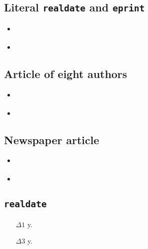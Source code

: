 \documentclass[a4paper,12pt]{scrartcl}
\newcommand{\Feld}[1]{\texttt{#1}}
\begin{document}
\subsection{Literal \Feld{realdate} and \Feld{eprint}}
\begin{itemize}
    \item\cite{lindauer:oj}%
    \item{}%
\end{itemize}

\subsection{Article of eight authors}
\begin{itemize}
    \item\cite{summerhayes:et:al:1993}%
    \item{}%
\end{itemize}

\subsection{Newspaper article}
\begin{itemize}
    \item\cite{stafford:2004}%
    \item{}%
\end{itemize}

\subsection{\Feld{realdate}}
\begin{itemize}
    \item[$\Delta 1$ y.]%
    \item[$\Delta 3$ y.]%
\end{itemize}

\printbibliography

\end{document}
